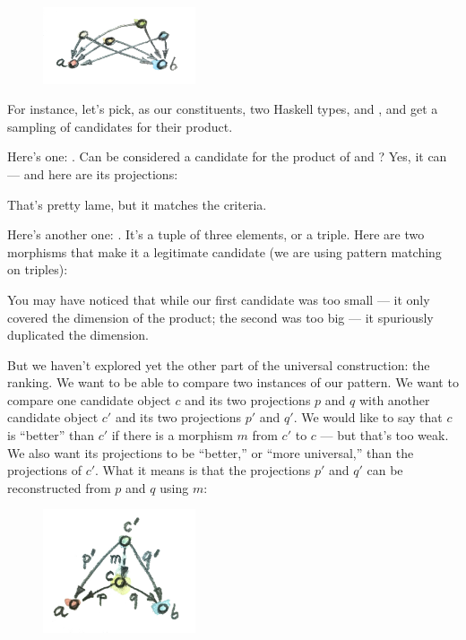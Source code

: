 \begin{figure}[H]
\centering
\includegraphics[width=0.4\textwidth]{images/productcandidates.jpg}
\end{figure}

\noindent
For instance, let's pick, as our constituents, two Haskell types,
 and , and get a sampling of candidates for
their product.

Here's one: . Can  be considered a candidate for
the product of  and ? Yes, it can --- and here
are its projections:

That's pretty lame, but it matches the criteria.

Here's another one: . It's a tuple of three
elements, or a triple. Here are two morphisms that make it a legitimate
candidate (we are using pattern matching on triples):

You may have noticed that while our first candidate was too small --- it
only covered the  dimension of the product; the second was
too big --- it spuriously duplicated the  dimension.

But we haven't explored yet the other part of the universal
construction: the ranking. We want to be able to compare two instances
of our pattern. We want to compare one candidate object $c$ and its
two projections $p$ and $q$ with another candidate object
$c'$ and its two projections $p'$ and $q'$. We would like
to say that $c$ is ``better'' than $c'$ if there is a morphism
$m$ from $c'$ to $c$ --- but that's too weak. We also
want its projections to be ``better,'' or ``more universal,'' than the
projections of $c'$. What it means is that the projections
$p'$ and $q'$ can be reconstructed from $p$ and $q$ using $m$:


\begin{figure}[H]
\centering
\includegraphics[width=0.4\textwidth]{images/productranking.jpg}
\end{figure}


